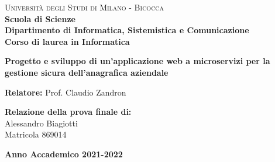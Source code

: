 \documentclass[a4paper,12pt]{report}
\begin{document}
    
    \begin{titlepage}
        
        \noindent
        \begin{minipage}[t]{0.19\textwidth}
        \end{minipage}
        \begin{minipage}[t]{0.81\textwidth}
        {
                {\textsc{Università degli Studi di Milano - Bicocca}} \\
                \textbf{Scuola di Scienze} \\
                \textbf{Dipartimento di Informatica, Sistemistica e Comunicazione} \\
                \textbf{Corso di laurea in Informatica} \\
                \par
        }
        \end{minipage}
        
	\vspace{40mm}
        
	\begin{center}
            {\LARGE{
                    \textbf{Progetto e sviluppo di un'applicazione web a microservizi per la gestione sicura dell'anagrafica aziendale}
                    \par
            }}
        \end{center}
        
        \vspace{50mm}

        \noindent
        {\large \textbf{Relatore:} Prof. Claudio Zandron } \\
        
        \vspace{15mm}

        \begin{flushright}
            {\large \textbf{Relazione della prova finale di:}} \\
            \large{Alessandro Biagiotti} \\
            \large{Matricola 869014} 
        \end{flushright}
        
        \vspace{35mm}
        \begin{center}
            {\large{\bf Anno Accademico 2021-2022}}
        \end{center}

        \restoregeometry
        
    \end{titlepage}
    
    \clearpage
    \clearpage
    
    \tableofcontents
    
    \clearpage
    
    
    
    \cleardoublepage


    
    \printbibliography
\end{document}
